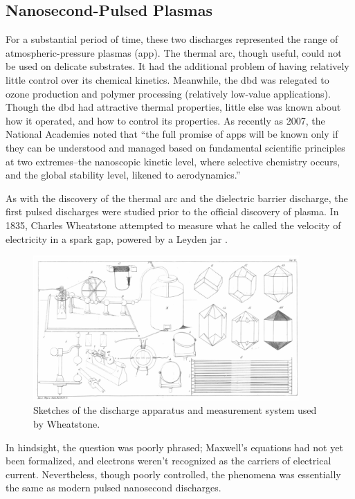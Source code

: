\subsection{Nanosecond-Pulsed Plasmas}

For a substantial period of time, these two discharges represented the range of
atmospheric-pressure plasmas (\acs{app}). The thermal arc, though useful, could
not be used on delicate substrates. It had the additional problem of having
relatively little control over its chemical kinetics. Meanwhile, the \acs{dbd}
was relegated to ozone production and polymer processing (relatively low-value
applications). Though the \acs{dbd} had attractive thermal properties, little
else was known about how it operated, and how to control its properties. As
recently as 2007, the National Academies noted that ``the full promise of
\acs{app}s will be known only if they can be understood and managed based on
fundamental scientific principles at two extremes--the nanoscopic kinetic level,
where selective chemistry occurs, and the global stability level, likened to
aerodynamics.'' \cite{NA2007}

As with the discovery of the thermal arc and the dielectric barrier discharge,
the first pulsed discharges were studied prior to the official discovery of
plasma. In 1835, Charles Wheatstone attempted to measure what he called the
velocity of electricity in a spark gap, powered by a Leyden jar
\cite{Wheatstone1835}.
\begin{figure}
  \centering
  \includegraphics[width=4in]{chapters/introduction/figures/wheatstone.png}
  \caption{Sketches of the discharge apparatus and measurement system used by
Wheatstone.}
\end{figure}
In hindsight, the question was poorly phrased; Maxwell's
equations had not yet been formalized, and electrons weren't recognized as the
carriers of electrical current. Nevertheless, though poorly controlled, the
phenomena was essentially the same as modern pulsed nanosecond discharges.

